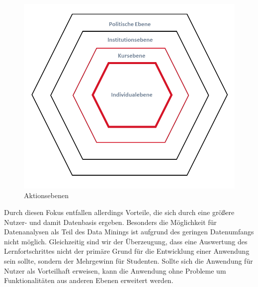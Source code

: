 \begin{figure}[]%
    \begin{center}
        \includegraphics[width=.7\textwidth]{img/Ebenen.png}
        \caption{Aktionsebenen}
        \label{fig:ebenen}
    \end{center}
\end{figure}

Durch diesen Fokus entfallen allerdings Vorteile, die sich durch eine größere Nutzer- und damit Datenbasis ergeben.
Besonders die Möglichkeit für Datenanalysen als Teil des Data Minings ist aufgrund des geringen Datenumfangs nicht möglich.
Gleichzeitig sind wir der Überzeugung, dass eine Auswertung des Lernfortschrittes nicht der primäre Grund für die Entwicklung einer Anwendung sein sollte, sondern der Mehrgewinn für Studenten.
Sollte sich die Anwendung für Nutzer als Vorteilhaft erweisen, kann die Anwendung ohne Probleme um Funktionalitäten aus anderen Ebenen erweitert werden.






